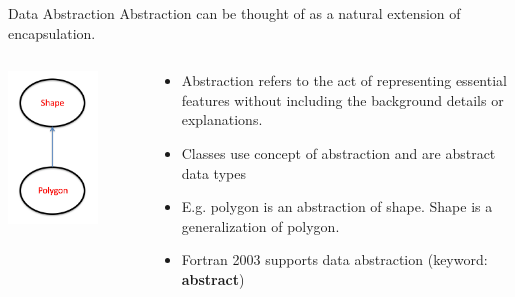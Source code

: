 \documentclass[11pt]{beamer}
\begin{document}
\begin{frame}{Data Abstraction}
Abstraction can be thought of as a natural extension of encapsulation.
\begin{columns}

 \begin{column}{0.38\textwidth}
        
\begin{center} 
  \includegraphics[width=0.7\textwidth]{../../shared/abstraction.png} 
\end{center} 

 \end{column}
  
  \begin{column}{0.7\textwidth}
    \begin{itemize}
        \item Abstraction refers to the act of representing essential features without including the background details or explanations.
        \item Classes use concept of abstraction and are abstract data types
	\item E.g. polygon is an abstraction of shape. Shape is a generalization of polygon.
	\item Fortran 2003 supports data abstraction (keyword: \textbf{abstract})
    \end{itemize}


\end{column}
\end{columns}
\end{frame}
\end{document}
